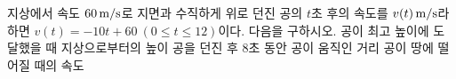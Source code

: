 지상에서 속도 $60\mkern3mu \mathrm{m/s}$로 지면과 수직하게 위로 던진 공의 $t$초 후의 속도를 $v(t)\mkern3mu \mathrm{m/s}$라 하면 $v(t)=-10t+60\ (0\le t\le 12)$이다. 다음을 구하시오.
 공이 최고 높이에 도달했을 때 지상으로부터의 높이
 공을 던진 후 $8$초 동안 공이 움직인 거리
 공이 땅에 떨어질 때의 속도
